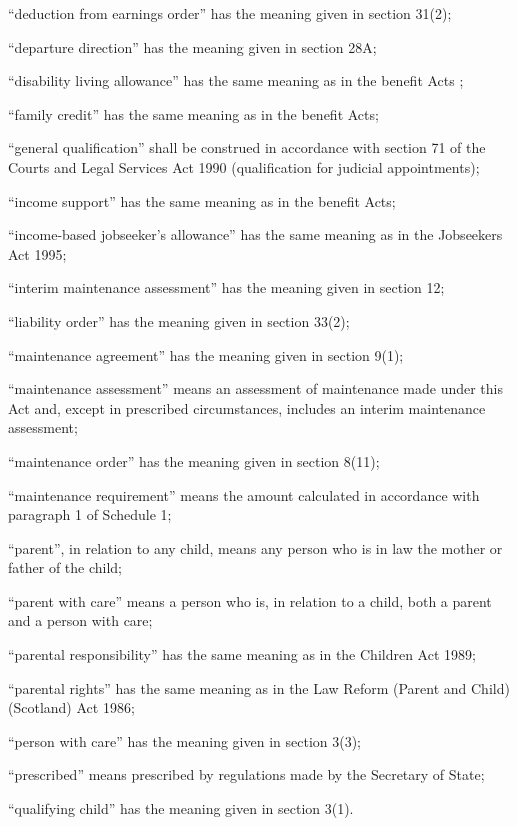 \documentclass[12pt,a4paper]{article}
\begin{document}
\begin{enumerate}
    “deduction from earnings order” has the meaning given in section 31(2);

“departure direction” has the meaning given in section 28A;

    “disability living allowance” has the same meaning as in the 
benefit Acts%
;

    “family credit” has the same meaning as in the benefit Acts;

    “general qualification” shall be construed in accordance with section 71 of the Courts and Legal Services Act 1990 (qualification for judicial appointments);

    “income support” has the same meaning as in the benefit Acts;

“income-based jobseeker’s allowance” has the same meaning as in the Jobseekers Act 1995;

    “interim maintenance assessment” has the meaning given in section 12;

    “liability order” has the meaning given in section 33(2);

    “maintenance agreement” has the meaning given in section 9(1);

    “maintenance assessment” means an assessment of maintenance made under this Act and, except in prescribed circumstances, includes an interim maintenance assessment;

    “maintenance order” has the meaning given in section 8(11);

    “maintenance requirement” means the amount calculated in accordance with paragraph 1 of Schedule 1;

    “parent”, in relation to any child, means any person who is in law the mother or father of the child;

“parent with care” means a person who is, in relation to a child, both a parent and a person with care;

    “parental responsibility” has the same meaning as in the Children Act 1989;

    “parental rights” has the same meaning as in the Law Reform (Parent and Child) (Scotland) Act 1986;

    “person with care” has the meaning given in section 3(3);

    “prescribed” means prescribed by regulations made by the Secretary of State;

    “qualifying child” has the meaning given in section 3(1).
\end{enumerate}
\end{document}

